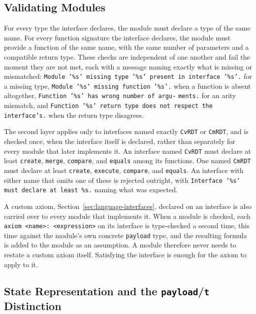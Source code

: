 \subsection{Validating Modules}
\label{sub:conformance}

For every type the interface declares, the module must declare a type of the same name. For every function signature the
interface declares, the module must provide a function of the same name, with the same number of parameters and a
compatible return type. These checks are independent of one another and fail the moment they are not met, each with a
message naming exactly what is missing or mismatched: \texttt{Module '\%s' missing type '\%s' present in interface '\%s'.}
for a missing type, \texttt{Module '\%s' missing function '\%s'.} when a function is absent altogether,
\texttt{Function '\%s' has wrong number of argu-} \texttt{ments.} for an arity mismatch, and \texttt{Function '\%s' return type does
not respect the} \texttt{interface's.} when the return type disagrees.

The second layer applies only to interfaces named exactly \texttt{CvRDT} or \texttt{CmRDT}, and is checked once, when the
interface itself is declared, rather than separately for every module that later implements it. An interface named
\texttt{CvRDT} must declare at least \texttt{create}, \texttt{merge}, \texttt{compare}, and \texttt{equals} among its
functions. One named \texttt{CmRDT} must declare at least \texttt{create}, \texttt{execute}, \texttt{compare}, and
\texttt{equals}. An interface with either name that omits one of these is rejected outright, with
\texttt{Interface '\%s' must declare at least \%s.} naming what was expected.

A custom axiom, Section~\ref{sec:language-interfaces}, declared on an interface is also carried over to every module that implements it. When a
module is checked, each \texttt{axiom <name>: <expression>} on its interface is type-checked a second time, this time
against the module's own concrete \texttt{payload} type, and the resulting formula is added to the module as an assumption.
A module therefore never needs to restate a custom axiom itself. Satisfying the interface is enough for the axiom to
apply to it.

\subsection{State Representation and the \texttt{payload}/\texttt{t} Distinction}
\label{sub:payload-t}

